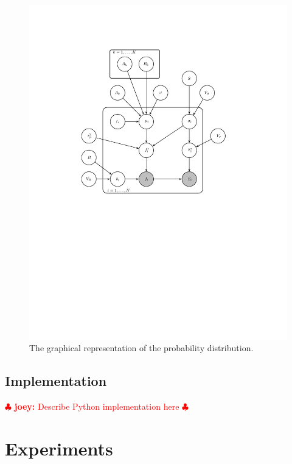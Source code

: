 \documentclass[12pt,preprint]{aastex}
\newcommand{\joey}[1] { \textcolor{red} {
\ensuremath{\clubsuit} {\bf joey:}  {#1}
\ensuremath{\clubsuit} } }%
\begin{document}
\begin{figure}[hbtp]
    \begin{center}
    \includegraphics[width=\textwidth,%
        trim=3cm 12cm 5cm 3cm, clip=true]{gm/gm.pdf}
    \end{center}
    \caption{The graphical representation of the probability distribution.
            \label{fig:graph}}
\end{figure}



\subsection{Implementation}
\label{ss:implemenation}



\joey{Describe Python implementation here}




\section{Experiments}
\label{sec:experiments}
\end{document}
